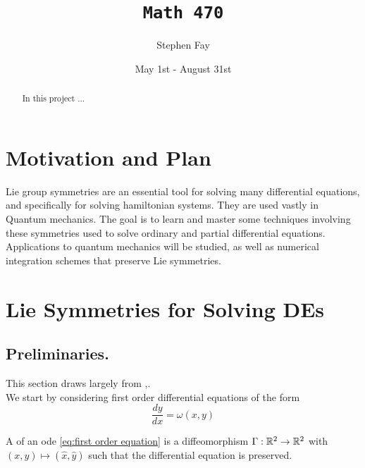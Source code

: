 \documentclass[12pt]{article}
\begin{document}
 
 
\title{\texttt{Math 470}}
\author{Stephen Fay}
\date{May 1st - August 31st}
\maketitle


\begin{abstract}
    In this project ...
\end{abstract}

\tableofcontents

\section{Motivation and Plan}

Lie group symmetries are an essential tool for solving many differential equations, and specifically for solving hamiltonian systems. They are used vastly in Quantum mechanics. The goal is to learn and master some techniques involving these symmetries used to solve ordinary and partial differential equations. Applications to quantum mechanics will be studied, as well as numerical integration schemes that preserve Lie symmetries. 

\section{Lie Symmetries for Solving DEs}

\subsection{Preliminaries.}

This section draws largely from \cite{R-Steinhour},\cite{Symmetry-methods}.\\ We start by considering first order differential equations of the form
\begin{equation}\label{eq:first order equation}
    \frac{dy}{dx} = \omega(x,y)
\end{equation}

A  of an ode \eqref{eq:first order equation} is a diffeomorphism $\Gamma : \mathbb{R}^2\to\mathbb{R}^2$ with $(x,y)\mapsto (\hat x,\hat y)$ such that the differential equation is preserved.
\end{document}
